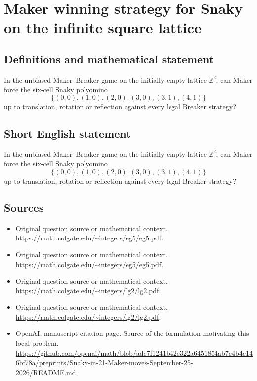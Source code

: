 \documentclass[11pt]{article}
\begin{document}
\section*{Maker winning strategy for Snaky on the infinite square lattice}\label{statement}
\subsection{Definitions and mathematical statement}
In the unbiased Maker–Breaker game on the initially empty lattice $\mathbb Z^2$, can Maker force the six-cell Snaky polyomino
\[\{(0,0),(1,0),(2,0),(3,0),(3,1),(4,1)\}\]
up to translation, rotation or reflection against every legal Breaker strategy?
\subsection{Short English statement}
In the unbiased Maker–Breaker game on the initially empty lattice $\mathbb Z^2$, can Maker force the six-cell Snaky polyomino
\[\{(0,0),(1,0),(2,0),(3,0),(3,1),(4,1)\}\]
up to translation, rotation or reflection against every legal Breaker strategy?
\subsection{Sources}
\begin{itemize}
\item[S1] Original question source or mathematical context.
\url{https://math.colgate.edu/~integers/eg5/eg5.pdf}.
\item[S2] Original question source or mathematical context.
\url{https://math.colgate.edu/~integers/eg5/eg5.pdf}.
\item[S3] Original question source or mathematical context.
\url{https://math.colgate.edu/~integers/lg2/lg2.pdf}.
\item[S4] Original question source or mathematical context.
\url{https://math.colgate.edu/~integers/lg2/lg2.pdf}.
\item[S5] OpenAI, manuscript citation page. Source of the formulation motivating this local problem.
\url{https://github.com/openai/math/blob/adc7f1241b42e322a6451854ab7e4b4c146bf78a/preprints/Snaky-in-21-Maker-moves-September-25-2026/README.md}.
\end{itemize}
\end{document}
